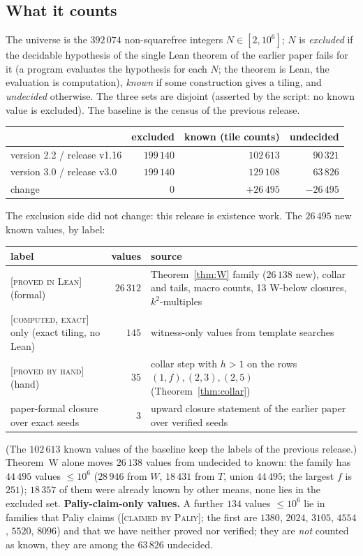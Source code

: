 \documentclass[11pt,reqno]{amsart}
\theoremstyle{plain}
\theoremstyle{definition}
\newcommand{\lab}[1]{\textup{[\textsc{#1}]}}
\newcommand{\PL}{\lab{proved in Lean}}
\newcommand{\PH}{\lab{proved by hand}}
\newcommand{\CE}{\lab{computed, exact}}
\newcommand{\CP}{\lab{claimed by Paliy}}
\begin{document}
\subsection{What it counts}
The universe is the $392\,074$ non-squarefree integers $N\in[2,10^6]$; $N$ is \emph{excluded} if the decidable hypothesis of the single Lean theorem of the earlier paper fails for it (a program evaluates the hypothesis for each $N$; the theorem is Lean, the evaluation is computation), \emph{known} if some construction gives a tiling, and \emph{undecided} otherwise.
The three sets are disjoint (asserted by the script: no known value is excluded).
The baseline is the census of the previous release.
\begin{center}\small
\begin{tabular}{@{}lrrr@{}}
\toprule
 & excluded & known (tile counts) & undecided\\
\midrule
version 2.2 / release v1.16 & $199\,140$ & $102\,613$ & $90\,321$\\
version 3.0 / release v3.0 & $199\,140$ & $129\,108$ & $63\,826$\\
change & $0$ & $+26\,495$ & $-26\,495$\\
\bottomrule
\end{tabular}
\end{center}
The exclusion side did not change: this release is existence work. The $26\,495$ new known values, by label:
\begin{center}\small
\begin{tabular}{@{}p{4.6cm}rp{6.0cm}@{}}
\toprule
label & values & source\\
\midrule
\PL{} (formal) & $26\,312$ & Theorem~\ref{thm:W} family ($26\,138$ new), collar and tails, macro counts, 13 W-below closures, $k^2$-multiples\\
\CE{} only (exact tiling, no Lean) & $145$ & witness-only values from template searches\\
\PH{} (hand) & $35$ & collar step with $h>1$ on the rows $(1,f),(2,3),(2,5)$ (Theorem~\ref{thm:collar})\\
paper-formal closure over exact seeds & $3$ & upward closure statement of the earlier paper over verified seeds\\
\bottomrule
\end{tabular}
\end{center}
(The $102\,613$ known values of the baseline keep the labels of the previous release.)
Theorem~W alone moves $26\,138$ values from undecided to known: the family has $44\,495$ values $\le10^6$ ($28\,946$ from $W$, $18\,431$ from $T$, union $44\,495$; the largest $f$ is $251$); $18\,357$ of them were already known by other means, none lies in the excluded set.
\textbf{Paliy-claim-only values.} A further $134$ values $\le10^6$ lie in families that Paliy claims (\CP{}; the first are $1380$, $2024$, $3105$, $4554$, $5520$, $8096$) and that we have neither proved nor verified; they are \emph{not} counted as known, they are among the $63\,826$ undecided.
\end{document}
